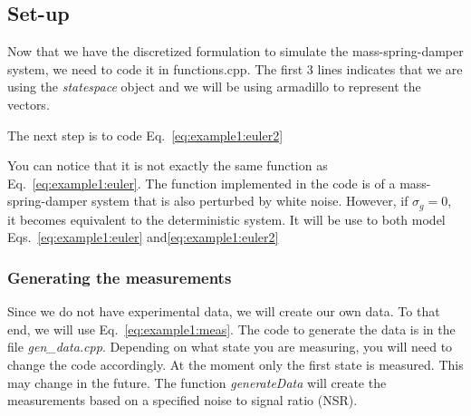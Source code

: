 \documentclass{article}
\begin{document}




\subsection{Set-up}

Now that we have the discretized formulation to simulate the mass-spring-damper system, we need to code it in functions.cpp. The first 3 lines indicates that we are using the {\em statespace} object and we will be using armadillo to represent the vectors.

%

The next step is to code  Eq.~\eqref{eq:example1:euler2}

% 

You can notice that it is not exactly the same function as Eq.~\eqref{eq:example1:euler}. The function implemented in the code is of a mass-spring-damper system that is also perturbed by white noise. However, if $\sigma_g = 0$, it becomes equivalent to the deterministic system. It will be use to both model Eqs.~\eqref{eq:example1:euler} and\eqref{eq:example1:euler2}

\subsubsection{Generating the measurements}

Since we do not have experimental data, we will create our own data. To that end, we will use Eq.~\eqref{eq:example1:meas}. The code to generate the data is in the file {\em gen\_data.cpp}. Depending on what state you are measuring, you will need to change the code accordingly. At the moment only the first state is measured. This may change in the future. The function {\em generateData} will create the measurements based on a specified noise to signal ratio (NSR).
\end{document}
